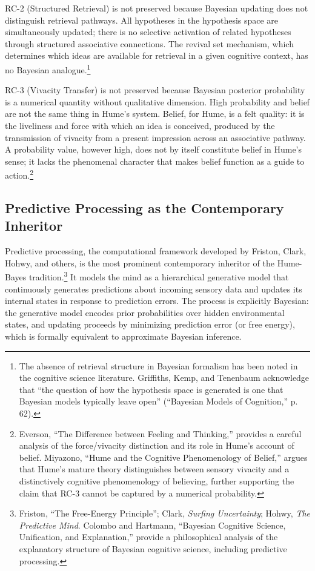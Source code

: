 \documentclass[11pt]{article}
\begin{document}
RC-2 (Structured Retrieval) is not preserved because Bayesian updating does not distinguish retrieval pathways. All hypotheses in the hypothesis space are simultaneously updated; there is no selective activation of related hypotheses through structured associative connections. The revival set mechanism, which determines which ideas are available for retrieval in a given cognitive context, has no Bayesian analogue.\footnote{The absence of retrieval structure in Bayesian formalism has been noted in the cognitive science literature. Griffiths, Kemp, and Tenenbaum acknowledge that ``the question of how the hypothesis space is generated is one that Bayesian models typically leave open'' (``Bayesian Models of Cognition,'' p. 62).}

RC-3 (Vivacity Transfer) is not preserved because Bayesian posterior probability is a numerical quantity without qualitative dimension. High probability and belief are not the same thing in Hume's system. Belief, for Hume, is a felt quality: it is the liveliness and force with which an idea is conceived, produced by the transmission of vivacity from a present impression across an associative pathway. A probability value, however high, does not by itself constitute belief in Hume's sense; it lacks the phenomenal character that makes belief function as a guide to action.\footnote{Everson, ``The Difference between Feeling and Thinking,'' provides a careful analysis of the force/vivacity distinction and its role in Hume's account of belief. Miyazono, ``Hume and the Cognitive Phenomenology of Belief,'' argues that Hume's mature theory distinguishes between sensory vivacity and a distinctively cognitive phenomenology of believing, further supporting the claim that RC-3 cannot be captured by a numerical probability.}

\subsection{Predictive Processing as the Contemporary Inheritor}

Predictive processing, the computational framework developed by Friston, Clark, Hohwy, and others, is the most prominent contemporary inheritor of the Hume-Bayes tradition.\footnote{Friston, ``The Free-Energy Principle''; Clark, \emph{Surfing Uncertainty}; Hohwy, \emph{The Predictive Mind}. Colombo and Hartmann, ``Bayesian Cognitive Science, Unification, and Explanation,'' provide a philosophical analysis of the explanatory structure of Bayesian cognitive science, including predictive processing.} It models the mind as a hierarchical generative model that continuously generates predictions about incoming sensory data and updates its internal states in response to prediction errors. The process is explicitly Bayesian: the generative model encodes prior probabilities over hidden environmental states, and updating proceeds by minimizing prediction error (or free energy), which is formally equivalent to approximate Bayesian inference.
\end{document}
